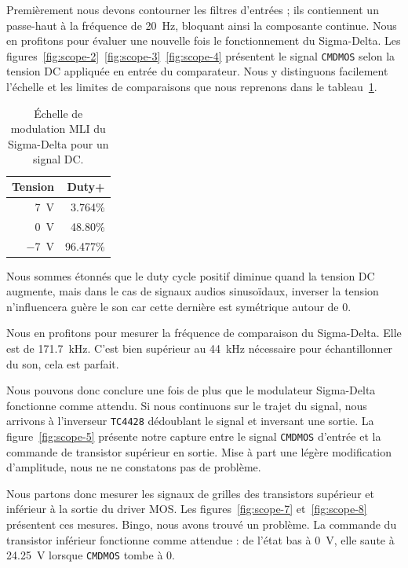 \documentclass[10pt, oneside, a4paper]{article}
\begin{document}
Premièrement nous devons contourner les filtres d'entrées ; ils contiennent un passe-haut à la fréquence de \SI{20}{\hertz}, bloquant ainsi la composante continue.
Nous en profitons pour évaluer une nouvelle fois le fonctionnement du Sigma-Delta.
Les figures~\ref{fig:scope-2}~\ref{fig:scope-3}~\ref{fig:scope-4} présentent le signal \texttt{CMDMOS} selon la tension DC appliquée en entrée du comparateur.
Nous y distinguons facilement l'échelle et les limites de comparaisons que nous reprenons dans le tableau~\ref{tab:dutyCycleDC}.
\begin{table}[!ht]
	\centering
	\begin{tabular}{|r|r|}
	\hline
	Tension & Duty+ \\
	\hline
	\SI{7}{\volt}  & \num{3.764}\% \\
	\SI{0}{\volt}  & \num{48.80}\% \\
	\SI{-7}{\volt} & \num{96.477}\% \\
	\hline
	\end{tabular}
	\caption{Échelle de modulation MLI du Sigma-Delta pour un signal DC.}
	\label{tab:dutyCycleDC}
\end{table}
Nous sommes étonnés que le duty cycle positif diminue quand la tension DC augmente, mais dans le cas de signaux audios sinusoïdaux, inverser la tension n'influencera guère le son car cette dernière est symétrique autour de 0.

Nous en profitons pour mesurer la fréquence de comparaison du Sigma-Delta.
Elle est de \SI{171.7}{\kilo\hertz}.
C'est bien supérieur au \SI{44}{\kilo\hertz} nécessaire pour échantillonner du son, cela est parfait.

Nous pouvons donc conclure une fois de plus que le modulateur Sigma-Delta fonctionne comme attendu.
Si nous continuons sur le trajet du signal, nous arrivons à l'inverseur \texttt{TC4428} dédoublant le signal et inversant une sortie.
La figure~\ref{fig:scope-5} présente notre capture entre le signal \texttt{CMDMOS} d'entrée et la commande de transistor supérieur en sortie.
Mise à part une légère modification d'amplitude, nous ne ne constatons pas de problème.

Nous partons donc mesurer les signaux de grilles des transistors supérieur et inférieur à la sortie du driver MOS.
Les figures~\ref{fig:scope-7} et~\ref{fig:scope-8} présentent ces mesures.
Bingo, nous avons trouvé un problème.
La commande du transistor inférieur fonctionne comme attendue : de l'état bas à \SI{0}{\volt}, elle saute à \SI{24.25}{\volt} lorsque \texttt{CMDMOS} tombe à 0.
\end{document}
